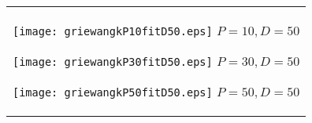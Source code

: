 \documentclass[a4paper,11pt,oneside,openany]{jsbook}
\begin{document}
\begin{figure}[htbp]
  \begin{center}
    \begin{tabular}{c}


      \begin{minipage}{0.33\hsize}
        \begin{center}
          \texttt{[image: griewangkP10fitD50.eps]}
          \hspace{1.2cm} $P=10, D=50
$        \end{center}
      \end{minipage}

      \begin{minipage}{0.33\hsize}
        \begin{center}
          \texttt{[image: griewangkP30fitD50.eps]}
          \hspace{1.2cm} $P=30, D=50
$        \end{center}
      \end{minipage}

      \begin{minipage}{0.33\hsize}
        \begin{center}
          \texttt{[image: griewangkP50fitD50.eps]}
          \hspace{1.2cm} $P=50, D=50
$        \end{center}
      \end{minipage}
    \end{tabular}
  \end{center}
\end{figure}
\end{document}
